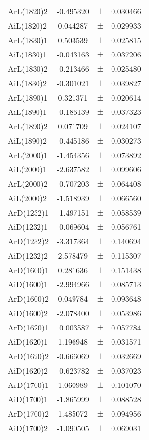 \begin{table}
\begin{tiny}
\begin{tabular}{lccc}
ArL(1820)2 & -0.495320 & $\pm$ & 0.030466 \\
AiL(1820)2 & 0.044287 & $\pm$ & 0.029933 \\
ArL(1830)1 & 0.503539 & $\pm$ & 0.025815 \\
AiL(1830)1 & -0.043163 & $\pm$ & 0.037206 \\
ArL(1830)2 & -0.213466 & $\pm$ & 0.025480 \\
AiL(1830)2 & -0.301021 & $\pm$ & 0.039827 \\
ArL(1890)1 & 0.321371 & $\pm$ & 0.020614 \\
AiL(1890)1 & -0.186139 & $\pm$ & 0.037323 \\
ArL(1890)2 & 0.071709 & $\pm$ & 0.024107 \\
AiL(1890)2 & -0.445186 & $\pm$ & 0.030273 \\
ArL(2000)1 & -1.454356 & $\pm$ & 0.073892 \\
AiL(2000)1 & -2.637582 & $\pm$ & 0.099606 \\
ArL(2000)2 & -0.707203 & $\pm$ & 0.064408 \\
AiL(2000)2 & -1.518939 & $\pm$ & 0.066560 \\
ArD(1232)1 & -1.497151 & $\pm$ & 0.058539 \\
AiD(1232)1 & -0.069604 & $\pm$ & 0.056761 \\
ArD(1232)2 & -3.317364 & $\pm$ & 0.140694 \\
AiD(1232)2 & 2.578479 & $\pm$ & 0.115307 \\
ArD(1600)1 & 0.281636 & $\pm$ & 0.151438 \\
AiD(1600)1 & -2.994966 & $\pm$ & 0.085713 \\
ArD(1600)2 & 0.049784 & $\pm$ & 0.093648 \\
AiD(1600)2 & -2.078400 & $\pm$ & 0.053986 \\
ArD(1620)1 & -0.003587 & $\pm$ & 0.057784 \\
AiD(1620)1 & 1.196948 & $\pm$ & 0.031571 \\
ArD(1620)2 & -0.666069 & $\pm$ & 0.032669 \\
AiD(1620)2 & -0.623782 & $\pm$ & 0.037023 \\
ArD(1700)1 & 1.060989 & $\pm$ & 0.101070 \\
AiD(1700)1 & -1.865999 & $\pm$ & 0.088528 \\
ArD(1700)2 & 1.485072 & $\pm$ & 0.094956 \\
AiD(1700)2 & -1.090505 & $\pm$ & 0.069031 \\
\bottomrule
\end{tabular}
\end{tiny}
\end{table}

